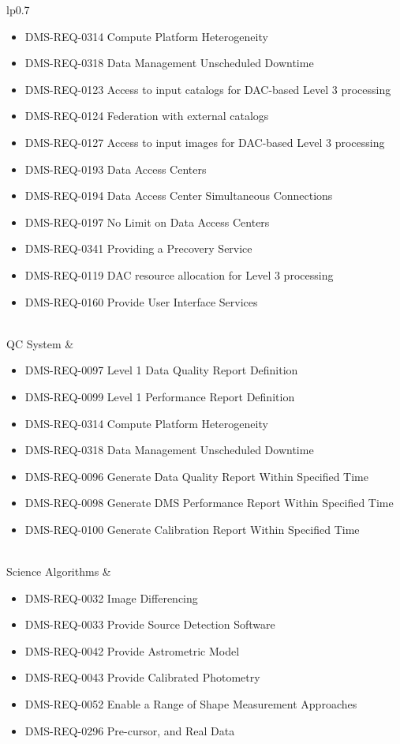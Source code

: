 \begin{xtabular}{lp{0.7\textwidth}}
\begin{itemize}
\item DMS-REQ-0314 Compute Platform Heterogeneity
\item DMS-REQ-0318 Data Management Unscheduled Downtime
\item DMS-REQ-0123 Access to input catalogs for DAC-based Level 3 processing
\item DMS-REQ-0124 Federation with external catalogs
\item DMS-REQ-0127 Access to input images for DAC-based Level 3 processing
\item DMS-REQ-0193 Data Access Centers
\item DMS-REQ-0194 Data Access Center Simultaneous Connections
\item DMS-REQ-0197 No Limit on Data Access Centers
\item DMS-REQ-0341 Providing a Precovery Service
\item DMS-REQ-0119 DAC resource allocation for Level 3 processing
\item DMS-REQ-0160 Provide User Interface Services
\end{itemize} \\ \hline
QC System &
\begin{itemize}
\item DMS-REQ-0097 Level 1 Data Quality Report Definition
\item DMS-REQ-0099 Level 1 Performance Report Definition
\item DMS-REQ-0314 Compute Platform Heterogeneity
\item DMS-REQ-0318 Data Management Unscheduled Downtime
\item DMS-REQ-0096 Generate Data Quality Report Within Specified Time
\item DMS-REQ-0098 Generate DMS Performance Report Within Specified Time
\item DMS-REQ-0100 Generate Calibration Report Within Specified Time
\end{itemize} \\ \hline
Science Algorithms &
\begin{itemize}
\item DMS-REQ-0032 Image Differencing
\item DMS-REQ-0033 Provide Source Detection Software
\item DMS-REQ-0042 Provide Astrometric Model
\item DMS-REQ-0043 Provide Calibrated Photometry
\item DMS-REQ-0052 Enable a Range of Shape Measurement Approaches
\item DMS-REQ-0296 Pre-cursor, and Real Data

\end{itemize}
\end{xtabular}
